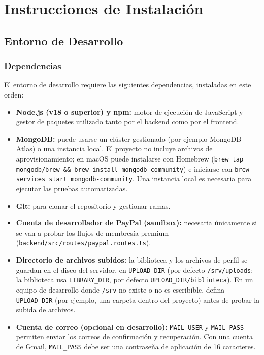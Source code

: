 \chapter{Instrucciones de Instalación}

\section{Entorno de Desarrollo}

\subsection{Dependencias}
El entorno de desarrollo requiere las siguientes dependencias, instaladas en este orden:
\begin{itemize}
    \item \textbf{Node.js (v18 o superior) y npm:} motor de ejecución de JavaScript y gestor de paquetes utilizado tanto por el backend como por el frontend.
    \item \textbf{MongoDB:} puede usarse un clúster gestionado (por ejemplo MongoDB Atlas) o una instancia local. El proyecto no incluye archivos de aprovisionamiento; en macOS puede instalarse con Homebrew (\texttt{brew tap mongodb/brew \&\& brew install mongodb-community}) e iniciarse con \texttt{brew services start mongodb-community}. Una instancia local es necesaria para ejecutar las pruebas automatizadas.
    \item \textbf{Git:} para clonar el repositorio y gestionar ramas.
    \item \textbf{Cuenta de desarrollador de PayPal (sandbox):} necesaria únicamente si se van a probar los flujos de membresía premium (\texttt{backend/src/routes/paypal.routes.ts}).
    \item \textbf{Directorio de archivos subidos:} la biblioteca y los archivos de perfil se guardan en el disco del servidor, en \texttt{UPLOAD\_DIR} (por defecto \texttt{/srv/uploads}; la biblioteca usa \texttt{LIBRARY\_DIR}, por defecto \texttt{UPLOAD\_DIR/biblioteca}). En un equipo de desarrollo donde \texttt{/srv} no existe o no es escribible, defina \texttt{UPLOAD\_DIR} (por ejemplo, una carpeta dentro del proyecto) antes de probar la subida de archivos.
    \item \textbf{Cuenta de correo (opcional en desarrollo):} \texttt{MAIL\_USER} y \texttt{MAIL\_PASS} permiten enviar los correos de confirmación y recuperación. Con una cuenta de Gmail, \texttt{MAIL\_PASS} debe ser una contraseña de aplicación de 16 caracteres.
\end{itemize}

